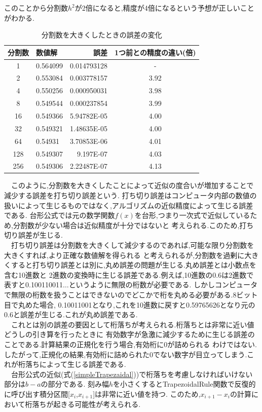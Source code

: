 \documentclass[dvipdfmx]{jarticle}
\begin{document}
      このことから分割数$h^2$が2倍になると,精度が4倍になるという予想が正しいことがわかる.
      \begin{table}[H]
        \caption{分割数を大きくしたときの誤差の変化}
      \label{error1}
      \begin{center}
          \begin{tabular}{c|l|r|c}\hline
            分割数 & 数値解 & 誤差 & 1つ前との精度の違い(倍) \\ \hline \hline
            1 & 0.564099 & 0.014793128 & - \\
            2 & 0.553084 & 0.003778157 & 3.92 \\
            4 & 0.550256 & 0.000950031 & 3.98 \\
            8 & 0.549544 & 0.000237854 & 3.99 \\
            16 & 0.549366 & 5.94782E-05 & 4.00 \\
            32 & 0.549321 & 1.48635E-05 & 4.00 \\
            64 & 0.54931 & 3.70853E-06 & 4.01 \\
            128 & 0.549307 & 9.197E-07 & 4.03 \\
            256 & 0.549306 & 2.22487E-07 & 4.13 \\ \hline 
          \end{tabular}
      \end{center}
      \end{table}
      　このように,分割数を大きくしたことによって近似の度合いが増加することで減少する誤差を打ち切り誤差という.
      打ち切り誤差はコンピュータ内部の数値の扱いによって生じるものではなく,アルゴリズムの近似精度によって生じる誤差である.
      台形公式では元の数学関数$f(x)$を台形,つまり一次式で近似しているため,分割数が少ない場合は近似精度が十分ではないと
      考えられる.このため,打ち切り誤差が生じる.\\
      　打ち切り誤差は分割数を大きくして減少するのであれば,可能な限り分割数を大きくすれば,より正確な数値解を得られる
      と考えられるが,分割数を過剰に大きくすると打ち切り誤差とは別に,丸め誤差の問題が生じる.丸め誤差とは小数点を含む10進数と
      2進数の変換時に生じる誤差である.例えば,10進数の0.6は2進数で表すと0.100110011$\dots$というように無限の桁数が必要である.
      しかしコンピュータで無限の桁数を扱うことはできないのでどこかで桁を丸める必要がある.8ビット目で丸めた場合,
      0.10011001となり,これを10進数に戻すと0.59765626となり元の0.6と誤差が生じる.これが丸め誤差である.\\
      　これとは別の誤差の要因として桁落ちが考えられる.桁落ちとは非常に近い値どうしの引き算を行ったときに
      有効数字が急激に減少するために生じる誤差のことである.計算結果の正規化を行う場合,有効桁に0が詰められる
      わけではない.したがって,正規化の結果,有効桁に詰められた0でない数字が目立ってしまう.これが桁落ちによって生じる誤差である.\\
      　台形公式の近似(式(\ref{simpleTrapezaidal}))で桁落ちを考慮しなければいけない部分は$b-a$の部分である.
      刻み幅$h$を小さくするとTrapezoidalRule関数で反復的に呼び出す積分区間[$x_i$,$x_{i+1}$]は非常に近い値を持つ.
      このため,$x_{i+1}-x_i$の計算において桁落ちが起きる可能性が考えられる.
\end{document}
